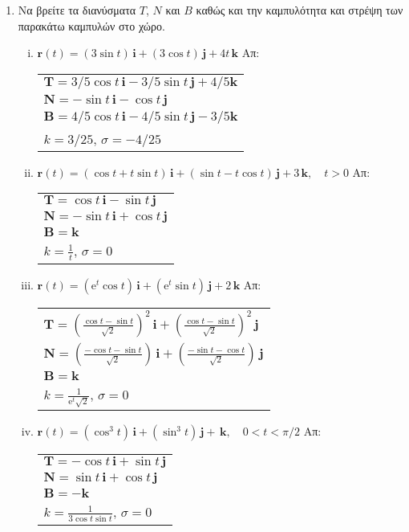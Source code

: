 \begin{enumerate}
  \item Να βρείτε τα διανύσματα $ T $, $N$ και $B$ καθώς και την καμπυλότητα και στρέψη  
    των παρακάτω καμπυλών στο χώρο.
    \begin{enumerate}[i)]
      \item $ \mathbf{r}(t)=(3 \sin{t})\, \mathbf{i} + (3 \cos{t})\, \mathbf{j} + 4t 
        \, \mathbf{k} $ 
        \hfill Απ: \begin{tabular}{l}
          $ \mathbf{T}=  3/5 \cos{t}\,\mathbf{i} - 3/5 \sin{t} \,\mathbf{j} + 4/5 
          \mathbf{k} $ \\
          $ \mathbf{N}=  - \sin{t}\,\mathbf{i} - \cos{t}\,\mathbf{j} $ \\
          $ \mathbf{Β}=  4/5 \cos{t}\,\mathbf{i} - 4/5\sin{t}\,\mathbf{j}-3/5 
          \mathbf{k} $ \\
          $ k = 3/25 $, $ \sigma = -4/25 $
        \end{tabular} 
      \item $ \mathbf{r}(t)=(\cos{t} + t \sin{t})\, \mathbf{i} + (\sin{t} -t \cos{t})
        \, \mathbf{j} + 3 \, \mathbf{k}, \quad t>0 $
        \hfill Απ: \begin{tabular}{l}
          $ \mathbf{T}=  \cos{t}\,\mathbf{i} - \sin{t}\,\mathbf{j} $ \\
          $ \mathbf{N}=  - \sin{t}\,\mathbf{i} + \cos{t}\,\mathbf{j} $ \\
          $ \mathbf{B}= \mathbf{k} $ \\
          $ k = \frac{1}{t} $, $ \sigma = 0 $  
        \end{tabular} 
      \item $ \mathbf{r}(t)=(\mathrm{e}^{t} \cos{t})\, \mathbf{i} + (\mathrm{e}^{t}
        \sin{t})\, \mathbf{j} + 2 \, \mathbf{k} $ 
        \hfill Απ: \begin{tabular}{l}
          $ \mathbf{T}=  (\frac{\cos{t} - \sin{t}}{\sqrt{2}} )^{2}\,\mathbf{i} +
          (\frac{\cos{t} - \sin{t}}{\sqrt{2}} )^{2}\,\mathbf{j}$ \\
          $ \mathbf{N}=  (\frac{- \cos{t} - \sin{t}}{\sqrt{2}})\,\mathbf{i} +
          (\frac{- \sin{t} - \cos{t}}{\sqrt{2}})\,\mathbf{j}$ \\
          $ \mathbf{B}= \mathbf{k} $ \\
          $ k = \frac{1}{\mathrm{e}^{t} \sqrt{2}} $, $ \sigma = 0 $ 
        \end{tabular} 
      \item $ \mathbf{r}(t)=(\cos^{3}{t})\, \mathbf{i} + (\sin^{3}{t})\, \mathbf{j} + \,
        \mathbf{k} , \quad 0<t< \pi /2$ 
        \hfill Απ: \begin{tabular}{l}
          $ \mathbf{T}=  - \cos{t}\,\mathbf{i} + \sin{t}\,\mathbf{j}$ \\
          $ \mathbf{N}=  \sin{t}\,\mathbf{i} + \cos{t}\,\mathbf{j} $ \\
          $ \mathbf{B}= -\mathbf{k} $ \\
          $ k = \frac{1}{3 \cos{t} \sin{t}} $, $ \sigma = 0 $ 
        \end{tabular} 
    \end{enumerate}
    

\end{enumerate}
